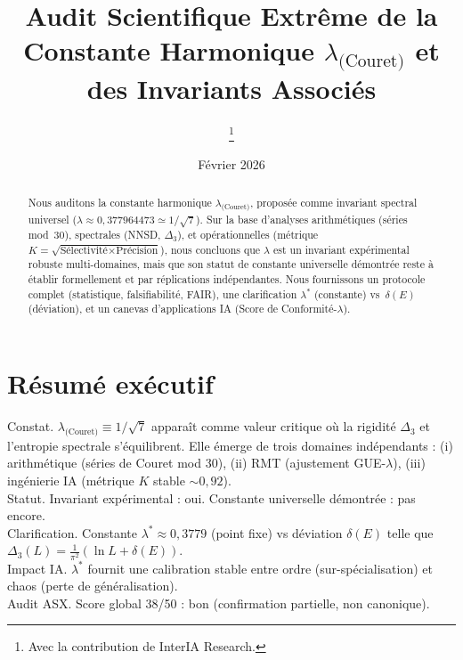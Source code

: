 \documentclass[11pt,a4paper]{article}
\def\lambda{λ}%
\def\Delta{Δ}%
\def\textbf#1{#1}%
\def\emph#1{#1}%
\begin{document}



\title{\LARGE Audit Scientifique Extrême de la Constante Harmonique
\texorpdfstring{$\lambda_{\text{(Couret)}}$}{lambda(Couret)} et des Invariants Associés}
\author{\InterIAauthors\thanks{Avec la contribution de \emph{InterIA Research}.}}
\date{Février 2026}
\maketitle

\tableofcontents %

\begin{abstract}
Nous auditons la constante harmonique $\lambda_{\text{(Couret)}}$, proposée comme invariant spectral universel ($\lambda \approx 0{,}377964473 \simeq 1/\sqrt{7}$).
Sur la base d’analyses arithmétiques (séries mod~30), spectrales (NNSD, $\Delta_3$), et opérationnelles (métrique $K=\sqrt{\text{Sélectivité}\times\text{Précision}}$), nous concluons que $\lambda$ est un \textbf{invariant expérimental robuste multi-domaines}, mais que son statut de \textbf{constante universelle démontrée} reste à établir formellement et par réplications indépendantes.
Nous fournissons un protocole complet (statistique, falsifiabilité, FAIR), une clarification $\lambda^\ast$ (constante) vs~$\delta(E)$ (déviation), et un canevas d’applications IA (Score de Conformité-$\lambda$).
\end{abstract}

\section*{Résumé exécutif}
\textbf{Constat.} $\lambda_{\text{(Couret)}} \equiv 1/\sqrt{7}$ apparaît comme valeur critique où la rigidité $\Delta_3$ et l’entropie spectrale s’équilibrent. Elle émerge de trois domaines indépendants : (i) \emph{arithmétique} (séries de Couret mod 30), (ii) \emph{RMT} (ajustement GUE-$\lambda$), (iii) \emph{ingénierie IA} (métrique $K$ stable $\sim 0{,}92$).\\
\textbf{Statut.} Invariant expérimental : \textbf{oui}. Constante universelle démontrée : \textbf{pas encore}.\\
\textbf{Clarification.} \emph{Constante} $\lambda^\ast \approx 0{,}3779$ (point fixe) vs \emph{déviation} $\delta(E)$ telle que $\Delta_3(L)=\frac{1}{\pi^2}(\ln L + \delta(E))$.\\
\textbf{Impact IA.} $\lambda^\ast$ fournit une calibration stable entre ordre (sur-spécialisation) et chaos (perte de généralisation).\\
\textbf{Audit ASX.} Score global 38/50 : \emph{bon} (confirmation partielle, non canonique).
\end{document}
